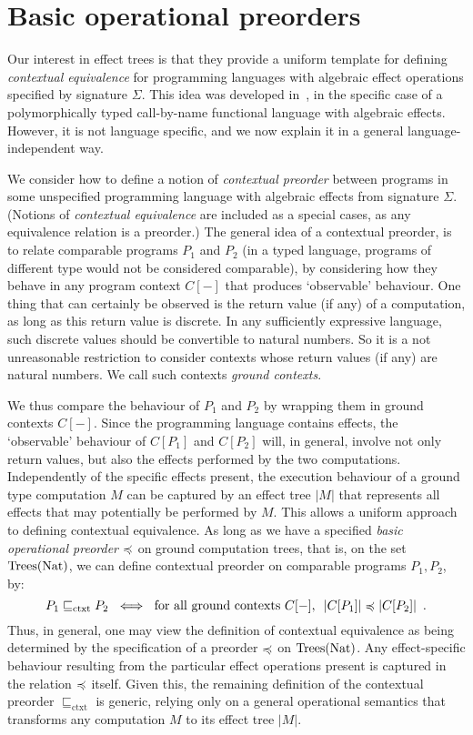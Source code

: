 \section{Basic operational preorders}

Our interest in effect trees is that they provide a 
uniform template for defining 
 \emph{contextual equivalence} for programming languages with algebraic effect operations
specified by signature $\Sigma$. This idea was developed in~\cite{gom}, in the specific case of a polymorphically typed call-by-name functional language with algebraic effects. However, it is not language specific, and we now explain it in a general language-independent way.

We consider how to define a notion of \emph{contextual preorder} between programs in some unspecified programming language with algebraic effects from signature $\Sigma$. (Notions of \emph{contextual equivalence}
are included as a special cases, as any equivalence relation is a preorder.) The general idea of a contextual preorder, is to relate comparable programs $P_1$ and $P_2$ (in a typed language, programs of different type would not be considered comparable), by considering how they behave in any program context $C[-]$ that produces `observable' behaviour. One thing that can certainly be observed is the return value (if any) of a computation, as long as this return value is discrete. In any sufficiently expressive language, such discrete values should be convertible to natural numbers. So it is a not unreasonable  restriction to consider contexts whose return values (if any) are natural numbers.  We call such contexts \emph{ground contexts}.

We thus compare the behaviour of $P_1$ and $P_2$ by wrapping them in ground contexts $C[-]$. Since the programming language contains effects, the `observable'  behaviour of  $C[P_1]$ and $C[P_2]$ will, in general, involve not only return values, but also  the effects performed by the two computations. 
Independently of the specific effects present, the execution behaviour of a ground type computation $M$ can be captured by an effect tree $|M|$ that represents all effects that may potentially be performed by $M$. This allows a uniform approach to defining contextual equivalence.  As long as we have a specified \emph{basic operational preorder}  $\preccurlyeq$  on ground  computation trees, that is, on the set $\textnormal{Trees}(\textnormal{Nat})$, we can define 
contextual preorder on comparable programs $P_1,P_2$, by:
\[ P_1 \sqsubseteq_\text{ctxt} P_2 ~ \iff ~
\text{for all ground contexts $C[-]$, $~ |C[P_1]| \preccurlyeq |C[P_2]|$} \enspace . \]
%
Thus, in general, one may view the definition of  contextual equivalence as being determined by the specification of a 
preorder  $\preccurlyeq$  on  $\textnormal{Trees}(\textnormal{Nat})$. Any effect-specific behaviour resulting from  the particular effect operations present is captured in the relation $\preccurlyeq$ itself. Given this, the remaining definition of the contextual preorder $\sqsubseteq_\text{ctxt}$ is generic, relying only on a general operational semantics that transforms any computation $M$ to its effect tree $|M|$.


